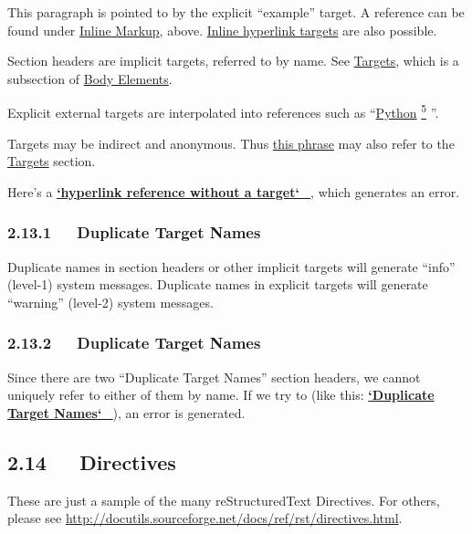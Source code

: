 \documentclass[a4paper]{article}
\providecommand*{\DUfootnotemark}[3]{%
  \raisebox{1em}{\hypertarget{#1}{}}%
  \hyperlink{#2}{\textsuperscript{#3}}%
}
\begin{document}
\label{example}
This paragraph is pointed to by the explicit “example” target. A
reference can be found under \hyperref[inline-markup]{Inline Markup}, above. \hyperref[inline-hyperlink-targets]{Inline
hyperlink targets} are also possible.

Section headers are implicit targets, referred to by name. See
\hyperref[targets]{Targets}, which is a subsection of \hyperref[body-elements]{Body Elements}.

Explicit external targets are interpolated into references such as
“\href{http://www.python.org/}{Python}\DUfootnotemark{footnote-reference-11}{footnote-6}{5}”.

Targets may be indirect and anonymous.  Thus \hyperref[targets]{this phrase} may also
refer to the \hyperref[targets]{Targets} section.

Here’s a %
\hyperlink{system-message-4}{\textbf{\color{red}`hyperlink reference without a target`\_}}, which generates an
error.


\subsubsection{2.13.1   Duplicate Target Names%
  \label{duplicate-target-names}%
}

Duplicate names in section headers or other implicit targets will
generate “info” (level-1) system messages.  Duplicate names in
explicit targets will generate “warning” (level-2) system messages.


\subsubsection{2.13.2   Duplicate Target Names%
  \label{duplicate-target-names-1}%
}

Since there are two “Duplicate Target Names” section headers, we
cannot uniquely refer to either of them by name.  If we try to (like
this: %
\hyperlink{system-message-5}{\textbf{\color{red}`Duplicate Target Names`\_}}), an error is generated.


\subsection{2.14   Directives%
  \label{directives}%
}

\label{contents}
These are just a sample of the many reStructuredText Directives.  For
others, please see
\url{http://docutils.sourceforge.net/docs/ref/rst/directives.html}.
\end{document}
